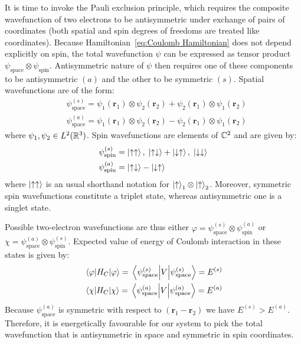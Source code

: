 It is time to invoke the Pauli exclusion principle, which requires the composite wavefunction
of two electrons to be antisymmetric under exchange of pairs of coordinates (both spatial and
spin degrees of freedoms are treated like coordinates). Because 
Hamiltonian~\ref{eq:Coulomb Hamiltonian} does not depend explicitly on spin, the total
wavefunction \(\psi\) can be expressed as tensor product \(\psi_{\mathrm{space}} 
\otimes \psi_{\mathrm{spin}} \). Antisymmetric nature of \(\psi\) then requires one 
of these components to be antisymmetric \((a)\) and the other to be symmetric \((s)\). 
Spatial wavefunctions are of the form:
\begin{align}
    &\psi_{\textrm{space}}^{(s)} = \psi_1(\bm{r}_1)\otimes \psi_2(\bm{r}_2) +
    \psi_2(\bm{r}_1)\otimes \psi_1(\bm{r}_2) \\
    &\psi_{\textrm{space}}^{(a)} = \psi_1(\bm{r}_1)\otimes \psi_2(\bm{r}_2) -
    \psi_2(\bm{r}_1)\otimes \psi_1(\bm{r}_2)
\end{align}
where \(\psi_1,\psi_2 \in L^2(\mathbb{R}^3)\). Spin wavefunctions are elements of \(\mathbb{C}^2\)
and are given by:
\begin{align}
    &\psi_{\textrm{spin}}^{(s)} = \ket{\uparrow\uparrow},\; 
    \ket{\uparrow\downarrow} + \ket{\downarrow\uparrow},\; \ket{\downarrow\downarrow} \\
    &\psi_{\textrm{spin}}^{(a)} = \ket{\uparrow\downarrow}-\ket{\downarrow\uparrow}
\end{align}
where \(\ket{\uparrow\uparrow}\) is an usual shorthand notation for \(\ket{\uparrow}_1 \otimes
\ket{\uparrow}_2\). Moreover, symmetric spin wavefunctions
constitute a triplet state, whereas antisymmetric one is a singlet state. 

Possible two-electron wavefunctions are thus either \(\varphi=\psi_{\textrm{space}}^{(s)}
\otimes \psi_{\textrm{spin}}^{(a)}\) or \(\chi = \psi_{\textrm{space}}^{(a)}
\otimes \psi_{\textrm{spin}}^{(s)}\). Expected value of energy of Coulomb interaction 
in these states is given by:
\begin{align}
    &\expectationvalue{H_C}{\varphi} = \expectationvalue{V}{\psi_{\textrm{space}}^{(s)}} = E^{(s)}\\
    &\expectationvalue{H_C}{\chi} = \expectationvalue{V}{\psi_{\textrm{space}}^{(a)}} = E^{(a)} 
\end{align}
Because \(\psi_{\textrm{space}}^{(a)}\) is symmetric with respect to \((\bm{r}_1-\bm{r}_2)\)
we have \(E^{(s)}>E^{(a)}\). Therefore, it is energetically
favourable for our system to pick the total wavefunction that is antisymmetric
in space and symmetric in spin coordinates.

